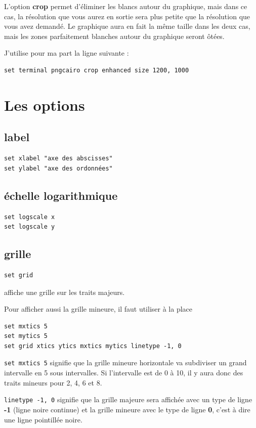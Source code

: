 \documentclass[a4paper,twoside]{article}
\begin{document}
\bigskip

L'option \textbf{crop} permet d'éliminer les blancs autour du graphique, mais dans ce cas, la résolution que vous aurez en sortie sera plus petite que la résolution que vous avez demandé. Le graphique aura en fait la même taille dans les deux cas, mais les zones parfaitement blanches autour du graphique seront ôtées.

J'utilise pour ma part la ligne suivante : 
\begin{verbatim}
set terminal pngcairo crop enhanced size 1200, 1000
\end{verbatim}

\section{Les options}
\subsection{label}
\begin{verbatim}
set xlabel "axe des abscisses"
set ylabel "axe des ordonnées"
\end{verbatim}

\subsection{échelle logarithmique}
\begin{verbatim}
set logscale x
set logscale y
\end{verbatim}

\subsection{grille}
\begin{verbatim}
set grid
\end{verbatim}
affiche une grille sur les traits majeurs.

Pour afficher aussi la grille mineure, il faut utiliser à la place 
\begin{verbatim}
set mxtics 5
set mytics 5
set grid xtics ytics mxtics mytics linetype -1, 0
\end{verbatim}
\texttt{set mxtics 5} signifie que la grille mineure horizontale va subdiviser un grand intervalle en 5 sous intervalles. Si l'intervalle est de 0 à 10, il y aura donc des traits mineurs pour 2, 4, 6 et 8. 

\texttt{linetype -1, 0} signifie que la grille majeure sera affichée avec un type de ligne \textbf{-1} (ligne noire continue) et la grille mineure avec le type de ligne \textbf{0}, c'est à dire une ligne pointillée noire.
\end{document}
